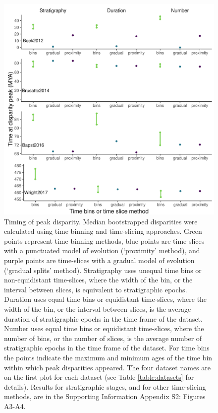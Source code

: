 \documentclass[12pt,a4paper]{article}
\begin{document}
\begin{figure}[!htbp]
    \centering
    \includegraphics[width=1\linewidth, height=1\textheight, keepaspectratio]{figures/Figure3-fig-peaks-epoch-revision.pdf}
    \caption[Timing of peak disparity for four example datasets.]
    {Timing of peak disparity.
    Median bootstrapped disparities were calculated using time binning and time-slicing approaches. 
    Green points represent time binning methods, blue points are time-slices with a punctuated model of evolution (`proximity' method), and purple points are time-slices with a gradual model of evolution (`gradual splits' method). 
    Stratigraphy uses unequal time bins or non-equidistant time-slices, where the width of the bin, or the interval between slices, is equivalent to stratigraphic epochs. 
    Duration uses equal time bins or equidistant time-slices, where the width of the bin, or the interval between slices, is the average duration of stratigraphic epochs in the time frame of the dataset. 
    Number uses equal time bins or equidistant time-slices, where the number of bins, or the number of slices, is the average number of stratigraphic epochs in the time frame of the dataset. 
    For time bins the points indicate the maximum and minimum ages of the time bin within which peak disparities appeared.
    The four dataset names are on the first plot for each dataset (see Table \ref{table:datasets} for details).
    Results for stratigraphic stages, and for other time-slicing methods, are in the Supporting Information Appendix S2: Figures A3-A4.}
    \label{figure:peak1}
\end{figure}
\end{document}
